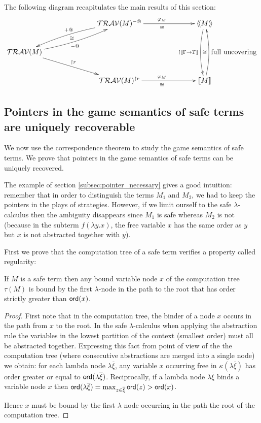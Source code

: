 The following diagram recapitulates the main results of this section:
$$
\xymatrix @C=6pc{
                                           & \travset(M)^{-@} \ar@/_/[dl]_{+@}  \ar[r]^{\varphi_M}_\cong & \intersem{M} \ar@/_/[dd]_{\upharpoonright \sem{\Gamma\rightarrow T}} \\
\travset(M) \ar@/_/[ur]_{-@}^{\cong} \ar[dr]^{\upharpoonright r}  \\
                                           & \travset(M)^{\upharpoonright r} \ar[r]^{\varphi_M}_\cong & \sem{M} \ar@/_/[uu]^{\cong}_{\mbox{full uncovering}}
}
$$



\subsection{Pointers in the game semantics of safe terms are uniquely recoverable}
We now use the correspondence theorem to study the game semantics of
safe terms. We prove that pointers in the game semantics of safe
terms can be uniquely recovered.

The example of section \ref{subsec:pointer_necessary} gives a good
intuition: remember that in order to distinguish the terms $M_1$ and
$M_2$, we had to keep the pointers in the plays of strategies.
However, if we limit ourself to the safe $\lambda$-calculus then the
ambiguity disappears since $M_1$ is safe whereas $M_2$ is not (because
in the subterm $f (\lambda y . x)$, the free variable $x$ has the same
order as $y$ but $x$ is not abstracted together with $y$).


First we prove that the computation tree of a safe term verifies a
property called regularity:
\begin{lem}
\label{lem:regularity}
If $M$ is a safe term then any bound variable node $x$ of the computation tree $\tau(M)$ is bound
by the first $\lambda$-node in the path to the root that has
order strictly greater than ${\sf ord}(x)$.
\end{lem}
\begin{proof}
First note that in the computation tree, the binder of a node $x$ occurs in the path from $x$ to the root.
In the safe $\lambda$-calculus when applying the abstraction rule the variables in the lowest partition of the context
(smallest order) must all be abstracted together. Expressing this fact from point of view of the the computation tree
(where consecutive abstractions are merged into a single node) we obtain:
for each lambda node $\lambda \overline{\xi}$, any variable $x$ occurring free in $\kappa(\lambda \overline{\xi})$
has order greater or equal to ${\sf ord}(\lambda \overline{\xi})$.
Reciprocally, if a lambda node $\lambda \overline{\xi}$ binds a variable node $x$ then ${\sf ord}(\lambda \overline{\xi}) = \max_{z\in\overline{\xi}} {\sf ord}(z) > {\sf ord}(x)$.

Hence $x$ must be bound by the first $\lambda$ node occurring in the path the root of the computation tree.
\end{proof}


